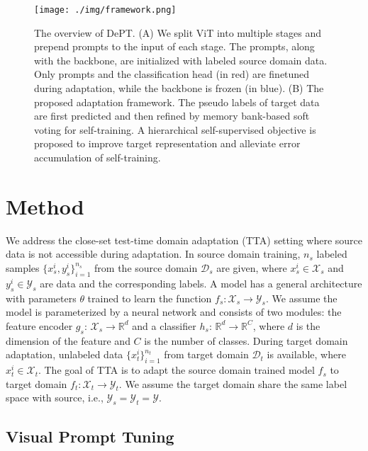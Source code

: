 \documentclass{article} \usepackage{iclr2023_conference,times}
\def\gX{{\mathcal{X}}}
\def\gY{{\mathcal{Y}}}
\newcommand{\R}{\mathbb{R}}
\begin{document}
\begin{figure}[t]
\begin{center}
\texttt{[image: ./img/framework.png]}
\end{center}
\caption{The overview of DePT. (A) We split ViT into multiple stages and prepend prompts to the input of each stage. The prompts, along with the backbone, are initialized with labeled source domain data. Only prompts and the classification head (in red) are finetuned during adaptation,  while the backbone is frozen (in blue). (B) The proposed adaptation framework. The pseudo labels of target data are first predicted and then refined by memory bank-based soft voting for self-training. A hierarchical self-supervised objective is proposed to improve target representation and alleviate error accumulation of self-training.}
\label{fig:framework}
\end{figure}


\section{Method}
We address the close-set test-time domain adaptation (TTA) setting where source data is not accessible during adaptation. In source domain training, $n_s$ labeled samples $\{x_s^i, y_s^i\}_{i=1}^{n_s}$ from the source domain $\mathcal{D}_s$ are given, where $x_s^i \in \displaystyle \gX_s$ and $y_s^i \in \displaystyle \gY_s$ are data and the corresponding labels. A model has a general architecture with parameters $\theta$ trained to learn the function $f_s: \displaystyle \gX_s \rightarrow \displaystyle \gY_s $. We assume the model is parameterized by a neural network and consists of two modules: the feature encoder $g_s$: $\displaystyle \gX_s \rightarrow \displaystyle \R^d$ and a classifier $h_s$: $\displaystyle \R^d \rightarrow \displaystyle \R^C$, where $d$ is the dimension of the feature and $C$ is the number of classes. During target domain adaptation, unlabeled data $\{x_t^i\}_{i=1}^{n_t}$ from target domain $\mathcal{D}_t$ is available, where $x_t^i \in \displaystyle \gX_t$. The goal of TTA is to adapt the source domain trained model $f_s$ to target domain $f_t: \displaystyle \gX_t \rightarrow \displaystyle \gY_t$. We assume the target domain share the same label space with source, i.e., $\displaystyle \gY_s = \displaystyle \gY_t = \displaystyle \gY$. 







\subsection{Visual Prompt Tuning}
\end{document}
